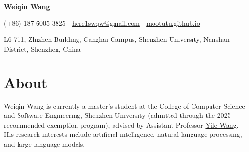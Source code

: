 \documentclass[a4paper,11pt]{article}
\newcommand{\socialicon}[1]{\raisebox{-0.05em}{\resizebox{!}{1em}{#1}}}
\newcommand{\ieeeicon}[1]{\raisebox{-0.3em}{\resizebox{!}{1.3em}{#1}}}
\newcommand{\headerfontiii}{\fontfamily{ppl}\selectfont} %
\begin{document}
\headerfontiii

\begin{center}
    {\Huge\textbf{Weiqin Wang}}
\end{center}
\vspace{-4.5mm}

\begin{center}
    \small
    {\color{black}{\footnotesize\faPhone*}\hspace*{0.13cm}(+86) 187-6005-3825} |
    \href{mailto:here1swqw@gmail.com}{{\color{black}{\footnotesize\faEnvelope[regular]}\hspace*{0.13cm}here1swqw@gmail.com}} |
    \href{https://mootutu.github.io/}{{\color{black}{\footnotesize\faGlobe}\hspace*{0.13cm}mootutu.github.io}}
\end{center}
\vspace{-4.5mm}

\begin{center}
    \small
    {\color{black}\footnotesize\faMapMarker*}\hspace*{0.13cm}L6-711, Zhizhen Building, Canghai Campus, Shenzhen University, Nanshan District, Shenzhen, China
\end{center}

\vspace{2mm}

\section{\textbf{About}}
\vspace{1mm}
\small{
Weiqin Wang is currently a master's student at the College of Computer Science and Software Engineering, Shenzhen University (admitted through the 2025 recommended exemption program), advised by Assistant Professor \href{https://ylwangy.github.io/}{Yile Wang}. His research interests include artificial intelligence, natural language processing, and large language models.
}
\vspace{1mm}
\end{document}

